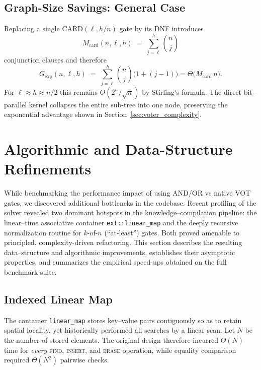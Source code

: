 \subsection{Graph-Size Savings: General Case}
\label{sec:card_graph_savings}

Replacing a single $\mathrm{CARD}(\ell,h/n)$ gate by its
DNF introduces
\[
  M_{\mathrm{card}}(n,\ell,h) \;=\;
  \sum_{j=\ell}^{h} \binom{n}{j}
\]
conjunction clauses and therefore
\[
  G_{\text{exp}}(n,\ell,h)
    \;=\;
  \sum_{j=\ell}^{h} \binom{n}{j}\bigl(1 + (j-1)\bigr)
    = \Theta\!\bigl(M_{\mathrm{card}}\,n\bigr).
\]
For $\ell \approx h \approx n/2$ this remains
$\Theta(2^{n}/\sqrt{n})$ by Stirling’s formula.
The direct bit-parallel kernel collapses the entire sub-tree into one
node, preserving the exponential advantage shown in
Section~\ref{sec:voter_complexity}.



\section{Algorithmic and Data-Structure Refinements}
\label{sec:kc_refinements}

While benchmarking the performance impact of using AND/OR vs native VOT gates, we discovered additional bottlencks in the codebase. Recent profiling of the solver revealed two dominant hotspots in the knowledge–compilation pipeline: the linear–time associative container \texttt{ext::linear\_map} and the deeply recursive normalization routine for $k$-of-$n$ (``at-least'') gates.  Both proved amenable to principled, complexity-driven refactoring.  This section describes the resulting data–structure and algorithmic improvements, establishes their asymptotic properties, and summarizes the empirical speed-ups obtained on the full benchmark suite.

\subsection{Indexed Linear Map}
\label{sec:kc_linear_map}

The container \texttt{linear\_map} stores key–value pairs contiguously so as to retain spatial locality, yet historically performed all searches by a linear scan.  Let $N$ be the number of stored elements.  The original design therefore incurred $\Theta(N)$ time for \emph{every} \textsc{find}, \textsc{insert}, and \textsc{erase} operation, while equality comparison required $\Theta(N^{2})$ pairwise checks.

